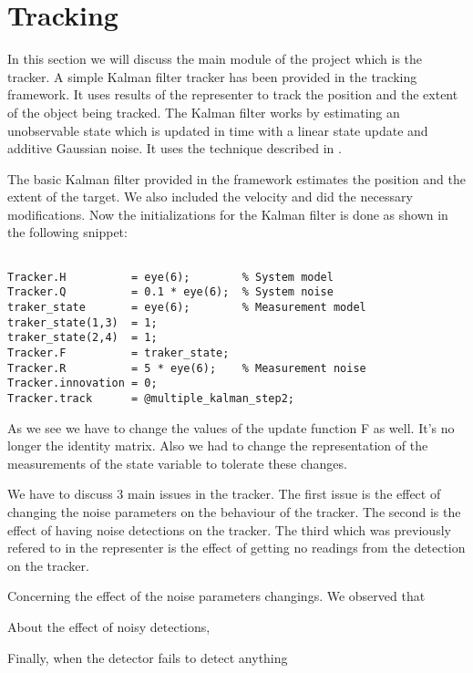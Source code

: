 \section{Tracking}

In this section we will discuss the main module of the project which is the tracker. A simple Kalman filter tracker has been provided in the tracking framework. It uses results of the representer to track the position and the extent of the object being tracked. The Kalman filter works by estimating an unobservable state which is updated in time with a linear state update and additive Gaussian noise. It uses the technique described in \cite{Arulampalam01atutorial}.

The basic Kalman filter provided in the framework estimates the position and the extent of the target. We also included the velocity and did the necessary modifications. Now the initializations for the Kalman filter is done as shown in the following snippet:

\begin{verbatim}

Tracker.H          = eye(6);        % System model
Tracker.Q          = 0.1 * eye(6);  % System noise
traker_state       = eye(6);        % Measurement model
traker_state(1,3)  = 1;
traker_state(2,4)  = 1;
Tracker.F          = traker_state;
Tracker.R          = 5 * eye(6);    % Measurement noise
Tracker.innovation = 0;
Tracker.track      = @multiple_kalman_step2;
\end{verbatim}

As we see we have to change the values of the update function F as well. It's no longer the identity matrix. Also we had to change the representation of the measurements of the state variable to tolerate these changes.

We have to discuss 3 main issues in the tracker. The first issue is the effect of changing the noise parameters on the behaviour of the tracker. The second is the effect of having noise detections on the tracker. The third which was previously refered to in the representer is the effect of getting no readings from the detection on the tracker.

Concerning the effect of the noise parameters changings. We observed that %

About the effect of noisy detections, %

Finally, when the detector fails to detect anything %
